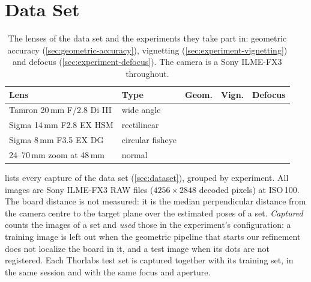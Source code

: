 \section{Data Set}
\label{sec:supp-dataset}
\begin{table}[t]
	\centering
	\footnotesize\setlength{\tabcolsep}{2.5pt}
	\begin{tabular*}{\linewidth}{@{\extracolsep{\fill}}llccc@{}}
		\toprule
		\textbf{Lens} & \textbf{Type} & \textbf{Geom.} & \textbf{Vign.} & \textbf{Defocus} \\
		\midrule
		Tamron 20\,mm F/2.8 Di III & wide angle & \checkmark & \checkmark & \checkmark \\
		Sigma 14\,mm F2.8 EX HSM & rectilinear & \checkmark & \checkmark & \checkmark \\
		Sigma 8\,mm F3.5 EX DG & circular fisheye & \checkmark & \checkmark & \checkmark \\
		24--70\,mm zoom at 48\,mm & normal & & & \checkmark \\
		\bottomrule
	\end{tabular*}
	\caption{The lenses of the data set and the experiments they take part in: geometric accuracy (\cref{sec:geometric-accuracy}), vignetting (\cref{sec:experiment-vignetting}) and defocus (\cref{sec:experiment-defocus}). The camera is a Sony ILME-FX3 throughout.}
	\label{tab:dataset-lenses}
\end{table}
 lists every capture of the data set (\cref{sec:dataset}), grouped by experiment. All images are Sony ILME-FX3 RAW files ($4256\times2848$ decoded pixels) at ISO\,100. The board distance is not measured: it is the median perpendicular distance from the camera centre to the target plane over the estimated poses of a set. \emph{Captured} counts the images of a set and \emph{used} those in the experiment's configuration: a training image is left out when the geometric pipeline that starts our refinement does not localize the board in it, and a test image when its dots are not registered. Each Thorlabs test set is captured together with its training set, in the same session and with the same focus and aperture.
